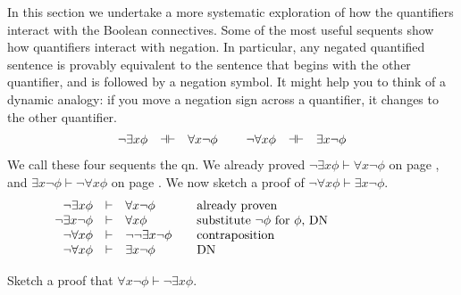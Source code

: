 In this section we undertake a more systematic exploration of how the
quantifiers interact with the Boolean connectives.  Some of the most
useful sequents show how quantifiers interact with negation.  In
particular, any negated quantified sentence is provably equivalent to
the sentence that begins with the other quantifier, and is followed by
a negation symbol.  It might help you to think of a dynamic analogy:
if you move a negation sign across a quantifier, it changes to the
other quantifier.
\[ \begin{array}{r c l p{0.1cm} r c l}
     \neg \exists x\phi & \dashv\vdash & \forall x\neg \phi & & \neg
                                                                \forall
                                                                x\phi
     & \dashv\vdash & \exists x\neg \phi \end{array} \] We call these four sequents the
 \gls{qn}.  We already proved $\neg \exists x\phi \vdash\forall x\neg\phi
  $ on page \pageref{qne}, and $\exists x\neg \phi
  \vdash\neg\forall x\phi$ on page \pageref{argh}.  We now
  sketch a proof of $\neg\forall x\phi\vdash \exists x\neg \phi
  $.
  \[ \begin{array}{r c l c p{6cm}}
    \neg\exists x\phi  & \vdash & \forall x\neg \phi  & & already proven \\
       \neg\exists x\neg\phi  & \vdash & \forall x  \phi  & & substitute
                                                           $\neg \phi
                                                           $ for
                                                            $\phi$, DN \\
     \neg\forall x\phi  & \vdash & \neg\neg\exists x\neg \phi  & &
                                                           contraposition \\
      \neg\forall x\phi & \vdash & \exists x\neg \phi & & DN \end{array} \]
\begin{exercise} Sketch a proof that $\forall x\neg\phi
  \vdash\neg\exists x\phi$. \end{exercise}



